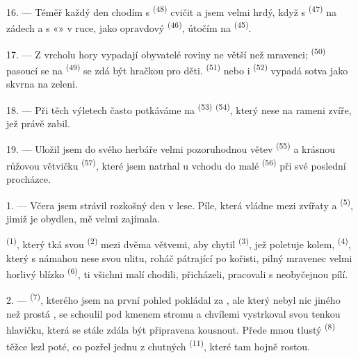 \VUsaut{3.0mm}

16. --- Téměř každý den chodím s  \textsuperscript{(48)} cvičit
 a jsem velmi hrdý, když s  \textsuperscript{(47)} na
zádech a s «» v ruce, jako opravdový 
\textsuperscript{(46)}, útočím na  \textsuperscript{(45)}.

17. --- Z vrcholu hory vypadají obyvatelé roviny ne větší než mravenci; 
\textsuperscript{(50)} pasoucí se na  \textsuperscript{(49)} se zdá být
hračkou pro děti.  \textsuperscript{(51)} nebo i
 \textsuperscript{(52)} vypadá sotva jako skvrna na zeleni.

18. --- Při těch výletech často potkáváme na  \textsuperscript{(53)}
 \textsuperscript{(54)}, který nese na rameni zvíře, jež právě
zabil.

19. --- Uložil jsem do svého herbáře velmi pozoruhodnou větev 
\textsuperscript{(55)} a krásnou růžovou větvičku  \textsuperscript{(57)}, které
jsem natrhal u vchodu do malé  \textsuperscript{(56)} při své poslední
procházce.

\VUsaut{3.0mm}
\VUsaut{3.0mm}

\VUsaut{3.0mm}

1. --- Včera jsem strávil rozkošný den v lese. Píle, která vládne mezi zvířaty a
 \textsuperscript{(5)}, jimiž je obydlen, mě velmi zajímala.

 \textsuperscript{(1)}, který tká svou 
\textsuperscript{(2)} mezi dvěma větvemi, aby chytil  \textsuperscript{(3)},
jež poletuje kolem,  \textsuperscript{(4)}, který s námahou nese svou ulitu,
roháč pátrající po kořisti, pilný mravenec velmi horlivý blízko 
\textsuperscript{(6)}, ti všichni malí chodili, přicházeli, pracovali s neobyčejnou pílí.

2. ---  \textsuperscript{(7)}, kterého jsem na první pohled pokládal za
, ale který nebyl nic jiného než prostá , se schoulil pod
kmenem stromu a chvílemi vystrkoval svou tenkou hlavičku, která se stále zdála být připravena
kousnout. Přede mnou tlustý  \textsuperscript{(8)} těžce lezl poté, co pozřel
jednu z chutných  \textsuperscript{(11)}, které tam hojně rostou.

